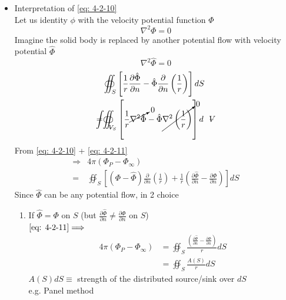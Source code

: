 \begin{itemize}
\item Interpretation of \eqref{eq: 4-2-10}\\
Let us identity $\phi$ with the velocity potential function $\Phi$
\[
\nabla^2\Phi = 0
\]
Imagine the solid body is replaced by another potential flow with velocity potential $\hat{\Phi}$
\[
\boxed{\nabla^2\hat{\Phi} = 0}
\]
\begin{equation}
\begin{aligned}
&\oiint_S\left[\frac{1}{r}\frac{\partial\hat{\Phi}}{\partial n} - \hat{\Phi}\frac{\partial}{\partial n}\left(\frac{1}{r}\right)\right]dS \\ 
= &{\oiint \hspace{-23.5pt} \int}_{\volume_S}\left[\frac{1}{r}\cancelto{0}{\nabla^2\hat{\Phi}}-\hat{\Phi}\cancelto{0}{\nabla^2\left(\frac{1}{r}\right)}\right]d\volume
\end{aligned}
\label{eq: 4-2-11}
\end{equation}
From \eqref{eq: 4-2-10} + \eqref{eq: 4-2-11}
\begin{equation}
\begin{aligned}
\Longrightarrow
&4\pi\left(\Phi_P-\Phi_\infty\right) \\ = &\oiint_S\left[\left(\Phi - \hat{\Phi}\right)\frac{\partial}{\partial n}\left(\frac{1}{r}\right) + \frac{1}{r}\left(\frac{\partial\hat{\Phi}}{\partial n} - \frac{\partial\Phi}{\partial n}\right)\right]dS
\end{aligned}
\label{eq: 4-2-12}
\end{equation}
Since $\hat{\Phi}$ can be any potential flow, in 2 choice
\begin{enumerate}[label = (\alph*)]
\item If $\hat{\Phi} = \Phi$ on $S$ (but $\displaystyle\frac{\partial \hat{\Phi}}{\partial n}\neq\frac{\partial\Phi}{\partial n}$ on $S$)\\
$\eqref{eq: 4-2-11}\Longrightarrow$
\begin{equation}
\begin{aligned}
4\pi\left(\Phi_P-\Phi_\infty\right) &= \oiint_S\frac{\displaystyle\left(\frac{\partial\hat{\Phi}}{\partial n} - \frac{\partial\Phi}{\partial n}\right)}{r}dS\\ &= \oiint_S\frac{A(S)}{r}dS
\end{aligned}
\label{eq: 4-2-13}
\end{equation}
$A(S)dS\equiv$ strength of the distributed source/sink over $dS$\\
e.g. Panel method

\end{enumerate}
\end{itemize}

